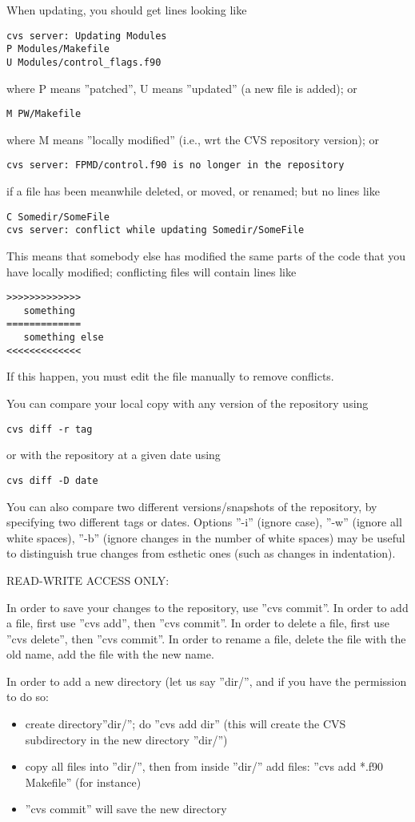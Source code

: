 \documentclass[12pt,a4paper]{article}
\begin{document}
When updating, you should get lines looking like
\begin{verbatim}
cvs server: Updating Modules
P Modules/Makefile
U Modules/control_flags.f90
\end{verbatim}
where P means ''patched'', U means ''updated'' (a new file is added); or
\begin{verbatim}
M PW/Makefile
\end{verbatim}
where M means ''locally modified'' (i.e., wrt the CVS repository
version); or
\begin{verbatim}
cvs server: FPMD/control.f90 is no longer in the repository
\end{verbatim}
if a file has been meanwhile deleted, or moved, or renamed; but no lines like
\begin{verbatim}
C Somedir/SomeFile
cvs server: conflict while updating Somedir/SomeFile
\end{verbatim}
This means that somebody else has modified the same parts of the code
that you have locally modified; conflicting files will contain lines
like 
\begin{verbatim}
>>>>>>>>>>>>>
   something
=============
   something else
<<<<<<<<<<<<<
\end{verbatim}
If this happen, you must edit the file manually to remove conflicts.

You can compare your local copy with any version of the repository
using
\begin{verbatim}
cvs diff -r tag
\end{verbatim}
or with the repository at a given date using
\begin{verbatim}
cvs diff -D date
\end{verbatim}
You can also compare two different versions/snapshots of the
repository, by specifying two different tags or dates. Options ''-i''
(ignore case), ''-w'' (ignore all white spaces), ''-b'' (ignore
changes in the number of white spaces) may be useful to distinguish
true changes from esthetic ones (such as changes in indentation). 

READ-WRITE ACCESS ONLY:

In order to save your changes to the repository, use ''cvs
commit''. In order to add a file, first use ''cvs add'', then ''cvs
commit''. In order to delete a file, first use ''cvs delete'', then
''cvs commit''. In order to rename a file, delete the file with the
old name, add the file with the new name. 

In order to add a new directory (let us say ''dir/'', and if you have
the permission to do so: 
\begin{itemize}
\item create directory''dir/''; do ''cvs add dir'' (this will create
  the CVS subdirectory in the new directory ''dir/'') 
\item copy all files into ''dir/'', then from inside ''dir/'' add
  files: ''cvs add *.f90 Makefile'' (for instance) 
\item ''cvs commit'' will save the new directory
\end{itemize}
\end{document}
